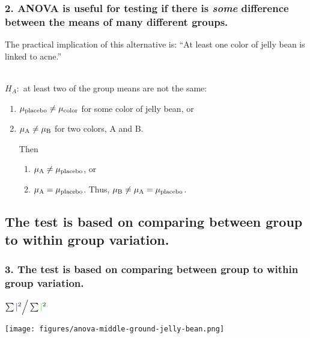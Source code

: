 \documentclass[slidestop,compress,mathserif,12pt,t,professionalfonts,xcolor=table]{beamer}
\newcommand{\mainideaB}{ANOVA is useful for testing if there is \emph{some} difference
  between the means of many different groups.}
\newcommand{\mainideaC}{The test is based on comparing between group to within group variation.}
\begin{document}

\begin{frame}
  \frametitle{2. \mainideaB}

The practical implication of this alternative is: ``At least one color of
jelly bean is linked to acne.''

\pause

\hfill \\

$H_A:$ at least two of the group means are not the same: \pause
\begin{enumerate}
\item $\mu_{\textmd{placebo}} \neq \mu_{\textmd{color}}$ for some color of jelly
  bean, or \pause
\item $\mu_{\textmd{A}} \neq \mu_{\textmd{B}}$ for two colors, A and B. \pause

\vspace{6pt}

Then 

\vspace{3pt}

\begin{enumerate}
\item $\mu_{\textmd{A}} \neq \mu_{\textmd{placebo}}$, or \pause

\item $\mu_{\textmd{A}} = \mu_{\textmd{placebo}}$.  Thus, $\mu_{\textmd{B}} \neq
  \mu_{\textmd{A}} = \mu_{\textmd{placebo}}$.
\end{enumerate}

\end{enumerate}

\end{frame}


\subsection{\mainideaC}
\label{mi3}


\begin{frame}
  \frametitle{3. \mainideaC}

\centering
\(
\sum {\color{blue} \mid}^2 \Big/ \sum {\color{green} \mid}^2
\)

  \texttt{[image: figures/anova-middle-ground-jelly-bean.png]}

\end{frame}
\end{document}
